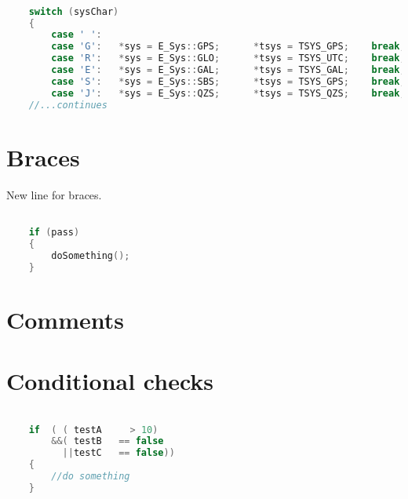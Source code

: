\begin{lstlisting}[language=c++]

    switch (sysChar)
    {
        case ' ':
        case 'G':   *sys = E_Sys::GPS;      *tsys = TSYS_GPS;    break;
        case 'R':   *sys = E_Sys::GLO;      *tsys = TSYS_UTC;    break;
        case 'E':   *sys = E_Sys::GAL;      *tsys = TSYS_GAL;    break;
        case 'S':   *sys = E_Sys::SBS;      *tsys = TSYS_GPS;    break;
        case 'J':   *sys = E_Sys::QZS;      *tsys = TSYS_QZS;    break;
    //...continues
\end{lstlisting}

\section{Braces}

New line for braces.
\begin{lstlisting}[language=c++]

    if (pass)
    {
        doSomething();
    }
\end{lstlisting}

\section{Comments}


\section{Conditional checks}
\begin{lstlisting}[language=c++]

    if  ( ( testA     > 10)
        &&( testB   == false
          ||testC   == false))
    {
        //do something
    }
\end{lstlisting}

